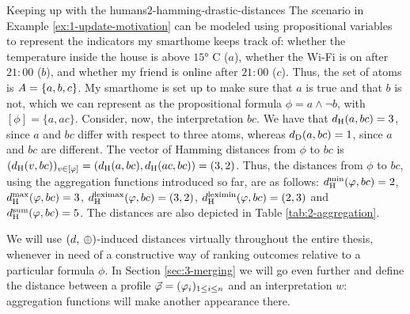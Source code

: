 \begin{xmpl}{Keeping up with the humans}{2-hamming-drastic-distances}
	The scenario in Example \ref{ex:1-update-motivation} can be modeled
	using propositional variables to represent 
	the indicators my smarthome keeps track of:
	whether the temperature inside the house is above $15\si{\degree}$ C ($a$),
	whether the Wi-Fi is on after $21{:}00$ ($b$),
	and whether my friend is online after $21{:}00$ ($c$).
	Thus, the set of atoms is $\Atoms=\{a,b,c\}$.
	My smarthome is set up to make sure that $a$ is true and that $b$ is not,
	which we can represent as the propositional formula $\phi=a\land\lnot b$,
	with $[\phi]=\{a,ac\}$. Consider, now, the interpretation $bc$.
	We have that 
	$\dd_\hamming(a,bc) = 3$, since $a$ and $bc$ differ with respect to three atoms,
	whereas $\dd_\drastic(a,bc)=1$, since $a$ and $bc$ are different.
	The vector of Hamming distances from $\phi$ to $bc$ is
	$(\dd_\hamming(v,bc))_{v\in[\phi]}=(\dd_{\hamming}(a,bc),\dd_{\hamming}(ac,bc)) = (3,2)$.
	Thus, the distances from $\phi$ to $bc$, using the aggregation functions 
	introduced so far, are as follows:
	$\dd_\hamming^\min(\phi,bc) = 2$,
	$\dd_\hamming^\max(\phi,bc) = 3$,
	$\dd_\hamming^\leximax(\phi,bc) = (3,2)$,
	$\dd_\hamming^\leximin(\phi,bc) = (2,3)$
	and
	$\dd_\hamming^\ssum(\phi,bc) = 5$.
	The distances are also depicted in Table \ref{tab:2-aggregation}.
\end{xmpl}

We will use $(\dd,\:\agg)$-induced distances virtually throughout the entire thesis,
whenever in need of a constructive way of ranking outcomes relative to a particular formula $\phi$.
In Section \ref{sec:3-merging} we will go even further and define the distance 
between a profile $\P=(\phi_i)_{1\le i \le n}$ and an interpretation $w$:
aggregation functions will make another appearance there.





























